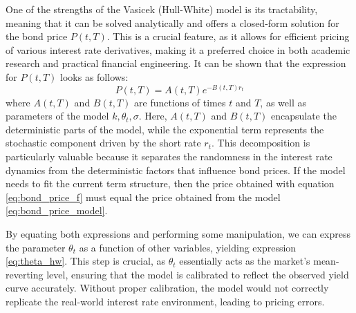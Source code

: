 \documentclass[titlepage, 12pt]{article}
\begin{document}
	One of the strengths of the Vasicek (Hull-White) model is its tractability, meaning that it can be solved analytically and offers a closed-form solution for the bond price \( P(t,T) \). This is a crucial feature, as it allows for efficient pricing of various interest rate derivatives, making it a preferred choice in both academic research and practical financial engineering. It can be shown that the expression for \( P(t,T) \) looks as follows:
	\begin{equation}\label{eq:bond_price_model}
		P(t,T) = A(t,T)e^{-B(t,T)r_t}
	\end{equation}
	where \( A(t,T) \) and \( B(t,T) \) are functions of times \( t \) and \( T \), as well as parameters of the model \( k, \theta_t, \sigma \). Here, \( A(t,T) \) and \( B(t,T) \) encapsulate the deterministic parts of the model, while the exponential term represents the stochastic component driven by the short rate \( r_t \). This decomposition is particularly valuable because it separates the randomness in the interest rate dynamics from the deterministic factors that influence bond prices. If the model needs to fit the current term structure, then the price obtained with equation \eqref{eq:bond_price_f} must equal the price obtained from the model \eqref{eq:bond_price_model}.

	By equating both expressions and performing some manipulation, we can express the parameter \( \theta_t \) as a function of other variables, yielding expression \eqref{eq:theta_hw}. This step is crucial, as \( \theta_t \) essentially acts as the market's mean-reverting level, ensuring that the model is calibrated to reflect the observed yield curve accurately. Without proper calibration, the model would not correctly replicate the real-world interest rate environment, leading to pricing errors.
	
\end{document}
